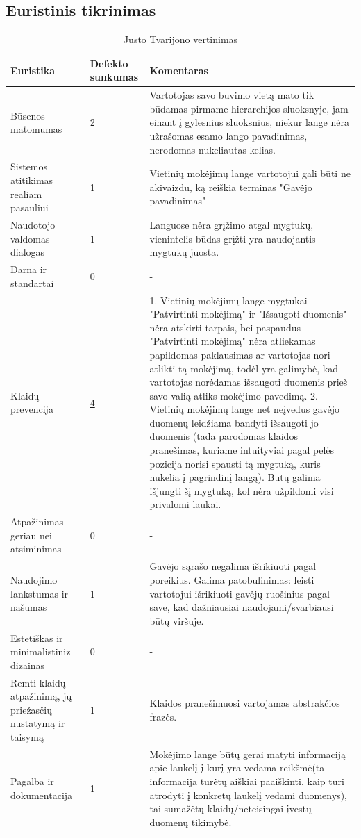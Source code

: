 \documentclass[oneside]{VUMIFPSkursinis}
\begin{document}
\subsection{Euristinis tikrinimas}
\begin{center}
\begin{longtable}[!htb]{|p{3.5cm}|p{1.9cm}|p{9.6cm}|}
	\caption{Justo Tvarijono vertinimas}
	\endfirsthead
	\endhead
  \hline
	Euristika & Defekto sunkumas & Komentaras \\ \hline
	Būsenos matomumas & 2 & Vartotojas savo buvimo vietą mato tik būdamas pirmame hierarchijos sluoksnyje, jam einant į gylesnius sluoksnius, niekur lange nėra užrašomas esamo lango pavadinimas, nerodomas nukeliautas kelias. \\ \hline
	Sistemos atitikimas realiam pasauliui & 1 & Vietinių mokėjimų lange vartotojui gali būti ne akivaizdu, ką reiškia terminas "Gavėjo pavadinimas" \\ \hline
	Naudotojo valdomas dialogas & 1 & Languose nėra grįžimo atgal mygtukų, vienintelis būdas grįžti yra naudojantis mygtukų juosta. \\ \hline
	Darna ir standartai & 0 & - \\ \hline
	Klaidų prevencija \label{lentele:klaiduPrevencijaJ} & \hyperref[fig:klaiduPrevencijaMygtukai]{4} & 1. Vietinių mokėjimų lange mygtukai "Patvirtinti mokėjimą" ir "Išsaugoti duomenis" nėra atskirti tarpais, bei paspaudus "Patvirtinti mokėjimą" nėra atliekamas papildomas paklausimas ar vartotojas nori atlikti tą mokėjimą, todėl yra galimybė, kad vartotojas norėdamas išsaugoti duomenis prieš savo valią atliks mokėjimo pavedimą. 2. Vietinių mokėjimų lange net neįvedus gavėjo duomenų leidžiama bandyti išsaugoti jo duomenis (tada parodomas klaidos pranešimas, kuriame intuityviai pagal pelės pozicija norisi spausti tą mygtuką, kuris nukelia į pagrindinį langą). Būtų galima išjungti šį mygtuką, kol nėra užpildomi visi privalomi laukai. \\ \hline
	Atpažinimas geriau nei atsiminimas & 0 & - \\ \hline
	Naudojimo lankstumas ir našumas & 1 & Gavėjo sąrašo negalima išrikiuoti pagal poreikius. Galima patobulinimas: leisti vartotojui išrikiuoti gavėjų ruošinius pagal save, kad dažniausiai naudojami/svarbiausi būtų viršuje. \\ \hline
	Estetiškas ir minimalistiniz dizainas & 0 & - \\ \hline
	Remti klaidų atpažinimą, jų priežasčių nustatymą ir taisymą & 1 & Klaidos pranešimuosi vartojamas abstrakčios frazės. \\ \hline
	Pagalba ir dokumentacija & 1 & Mokėjimo lange būtų gerai matyti informaciją apie laukelį į kurį yra vedama reikšmė(ta informacija turėtų aiškiai paaiškinti, kaip turi atrodyti į konkretų laukelį vedami duomenys), tai sumažėtų klaidų/neteisingai įvestų duomenų tikimybė.  \\ \hline
\end{longtable}
\end{center}
\end{document}
